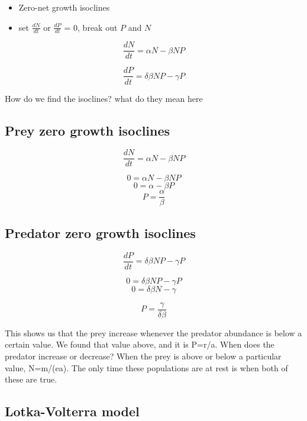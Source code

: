 \documentclass[
  letterpaper,
  DIV=11,
  numbers=noendperiod]{scrartcl}
\begin{document}
\begin{itemize}
\item
  Zero-net growth isoclines
\item
  set \(\frac{dN}{dt}\) or \(\frac{dP}{dt}\) = 0, break out \(P\) and
  \(N\)
\end{itemize}

\[\frac{dN}{dt}=\alpha N - \beta NP\]

\[\frac{dP}{dt}=\delta \beta NP-\gamma P\]

How do we find the isoclines? what do they mean here

\hypertarget{prey-zero-growth-isoclines}{%
\subsection{Prey zero growth
isoclines}\label{prey-zero-growth-isoclines}}

\[\frac{dN}{dt}=\alpha N - \beta NP\]

\[0=\alpha N - \beta NP\] \[0=\alpha - \beta P\]
\[P=\frac{\alpha}  {\beta} \]

\hypertarget{predator-zero-growth-isoclines}{%
\subsection{Predator zero growth
isoclines}\label{predator-zero-growth-isoclines}}

\[\frac{dP}{dt}=\delta \beta NP-\gamma P\]

\[0=\delta \beta NP-\gamma P\] \[0=\delta \beta N-\gamma\]

\[P=\frac{\gamma}  {\delta\beta} \]

This shows us that the prey increase whenever the predator abundance is
below a certain value. We found that value above, and it is P=r/a. When
does the predator increase or decrease? When the prey is above or below
a particular value, N=m/(ea). The only time these populations are at
rest is when both of these are true.

\hypertarget{lotka-volterra-model-2}{%
\subsection{Lotka-Volterra model}\label{lotka-volterra-model-2}}
\end{document}
